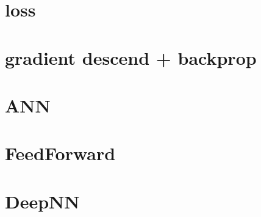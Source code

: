 \section{loss}
\section{gradient descend + backprop}
\section{ANN}
\section{FeedForward}
\section{DeepNN}



